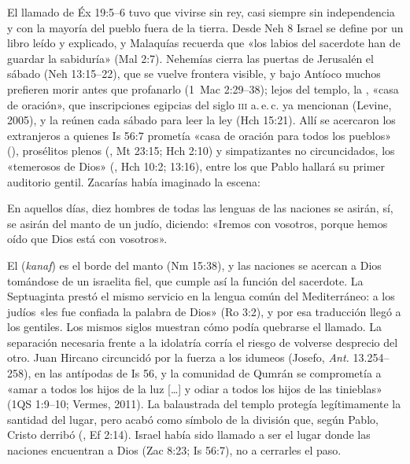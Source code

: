 El llamado de Éx 19:5--6 tuvo que vivirse sin rey, casi siempre sin independencia y con la mayoría del pueblo fuera de la tierra. Desde Neh 8 Israel se define por un libro leído y explicado, y Malaquías recuerda que «los labios del sacerdote han de guardar la sabiduría» (Mal 2:7). Nehemías cierra las puertas de Jerusalén el sábado (Neh 13:15--22), que se vuelve frontera visible, y bajo Antíoco muchos prefieren morir antes que profanarlo (1~Mac 2:29--38); lejos del templo, la , «casa de oración», que inscripciones egipcias del siglo \textsc{iii} a.\,e.\,c. ya mencionan (Levine, 2005), y la  reúnen cada sábado para leer la ley (Hch 15:21). Allí se acercaron los extranjeros a quienes Is 56:7 prometía «casa de oración para todos los pueblos» (), prosélitos plenos (, Mt 23:15; Hch 2:10) y simpatizantes no circuncidados, los «temerosos de Dios» (, Hch 10:2; 13:16), entre los que Pablo hallará su primer auditorio gentil. Zacarías había imaginado la escena:
\begin{cita}En aquellos días, diez hombres de todas las lenguas de las naciones se asirán, sí, se asirán del manto de un judío, diciendo: «Iremos con vosotros, porque hemos oído que Dios está con vosotros».\end{cita}
El  (\emph{kanaf}) es el borde del manto (Nm 15:38), y las naciones se acercan a Dios tomándose de un israelita fiel, que cumple así la función del sacerdote. La Septuaginta prestó el mismo servicio en la lengua común del Mediterráneo: a los judíos «les fue confiada la palabra de Dios» (Ro 3:2), y por esa traducción llegó a los gentiles. Los mismos siglos muestran cómo podía quebrarse el llamado. La separación necesaria frente a la idolatría corría el riesgo de volverse desprecio del otro. Juan Hircano circuncidó por la fuerza a los idumeos (Josefo, \emph{Ant.} 13.254--258), en las antípodas de Is 56, y la comunidad de Qumrán se comprometía a «amar a todos los hijos de la luz [\ldots] y odiar a todos los hijos de las tinieblas» (1QS 1:9--10; Vermes, 2011). La balaustrada del templo protegía legítimamente la santidad del lugar, pero acabó como símbolo de la división que, según Pablo, Cristo derribó (, Ef 2:14). Israel había sido llamado a ser el lugar donde las naciones encuentran a Dios (Zac 8:23; Is 56:7), no a cerrarles el paso.

